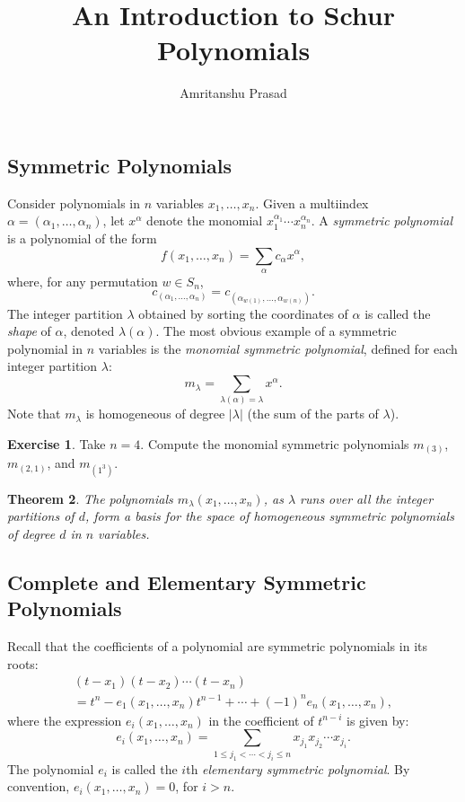 \documentclass[11pt]{amsproc}
\title{An Introduction to Schur Polynomials}
\author{Amritanshu Prasad}
\newtheorem{theorem}{Theorem}[subsection]
\theoremstyle{definition}
\theoremstyle{example}
\newtheorem{exercise}[theorem]{Exercise}
\begin{document}
\maketitle
\setcounter{tocdepth}{2}
\tableofcontents
\subsection{Symmetric Polynomials}
\label{sec:symmetric-functions}
Consider polynomials in $n$ variables \linebreak $x_1,\dotsc,x_n$.
Given a multiindex $\alpha=(\alpha_1,\dotsc, \alpha_n)$, let $x^\alpha$ denote the monomial $x_1^{\alpha_1}\dotsb x_n^{\alpha_n}$.
A \emph{symmetric polynomial} is a polynomial of the form
\begin{displaymath}
  f(x_1,\dotsc, x_n) = \sum_{\alpha} c_\alpha x^\alpha,
\end{displaymath}
where, for any permutation $w\in S_n$,
\begin{displaymath}
  c_{(\alpha_1,\dotsc,\alpha_n)} = c_{(\alpha_{w(1)},\dotsc,\alpha_{w(n)})}.
\end{displaymath}
The integer partition $\lambda$ obtained by sorting the coordinates of $\alpha$  is called the \emph{shape} of $\alpha$, denoted $\lambda(\alpha)$.
The most obvious example of a symmetric polynomial in $n$ variables is the \emph{monomial symmetric polynomial}, defined for each integer partition $\lambda$:
\begin{displaymath}
  m_\lambda = \sum_{\lambda(\alpha) = \lambda} x^\alpha.
\end{displaymath}
Note that $m_\lambda$ is homogeneous of degree $|\lambda|$ (the sum of the parts of $\lambda$).
\begin{exercise}
  Take $n=4$. Compute the monomial symmetric polynomials $m_{(3)}$, $m_{(2,1)}$, and $m_{(1^3)}$.
\end{exercise}
\begin{theorem}
The polynomials $m_\lambda(x_1,\dotsc,x_n)$, as $\lambda$ runs over all the integer partitions of $d$, form a basis for the space of homogeneous symmetric polynomials of degree $d$ in $n$ variables.
\end{theorem}
\subsection{Complete and Elementary Symmetric Polynomials}
\label{sec:compl-elem-symm}
Recall that the coefficients of a polynomial are symmetric polynomials in its roots:
\begin{multline}
  \label{eq:elem-id}
  (t-x_1)(t-x_2)\dotsb (t-x_n) \\= t^n - e_1(x_1,\dotsc, x_n)t^{n-1} + \dotsb + (-1)^n e_n(x_1,\dotsc, x_n),
\end{multline}
where the expression $e_i(x_1,\dotsc, x_n)$ in the coefficient of $t^{n-i}$ is given by:
\begin{equation}
  \label{eq:elem}
  e_i(x_1,\dotsc, x_n) = \sum_{1\leq j_1<\dotsb<j_i\leq n} x_{j_1}x_{j_2}\dotsb x_{j_i}.
\end{equation}
The polynomial $e_i$ is called the $i$th \emph{elementary symmetric polynomial}.
By convention, $e_i(x_1,\dotsc,x_n)=0$, for $i>n$.
\end{document}
